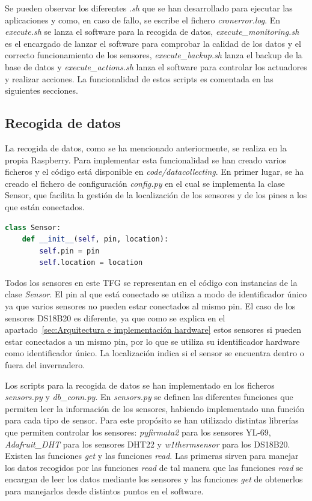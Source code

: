 \documentclass[a4paper, 12pt, oneside]{book}
\begin{document}
Se pueden observar los diferentes \textit{.sh} que se han desarrollado para ejecutar las aplicaciones y como, en caso de fallo, se escribe el fichero \textit{cronerror.log}.
En \textit{execute.sh} se lanza el software para la recogida de datos, \textit{execute\_monitoring.sh} es el encargado de lanzar el software para comprobar la calidad de los datos y el correcto funcionamiento de los sensores, \textit{execute\_backup.sh} lanza el backup de la base de datos y \textit{execute\_actions.sh} lanza el software para controlar los actuadores y realizar acciones. La funcionalidad de estos scripts es comentada en las siguientes secciones.

\subsection{Recogida de datos}
\label{subsec:recogida de datos}
La recogida de datos, como se ha mencionado anteriormente, se realiza en la propia Raspberry. Para implementar esta funcionalidad se han creado varios ficheros y el código está disponible en \textit{code/datacollecting}. En primer lugar, se ha creado el fichero de configuración \textit{config.py} en el cual se implementa la clase Sensor, que facilita la gestión de la localización de los sensores y de los pines a los que están conectados.

\begin{lstlisting}[language=Python]
class Sensor:
    def __init__(self, pin, location):
        self.pin = pin
        self.location = location
\end{lstlisting}

Todos los sensores en este TFG se representan en el código con instancias de la clase \textit{Sensor}. El pin al que está conectado se utiliza a modo de identificador único ya que varios sensores no pueden estar conectados al mismo pin. El caso de los sensores DS18B20 es diferente, ya que como se explica en el apartado~\ref{sec:Arquitectura e implementación hardware} estos sensores si pueden estar conectados a un mismo pin, por lo que se utiliza su identificador hardware como identificador único. La localización indica si el sensor se encuentra dentro o fuera del invernadero.

Los scripts para la recogida de datos se han implementado en los ficheros \textit{sensors.py} y \textit{db\_conn.py}. En \textit{sensors.py} se definen las diferentes funciones que permiten leer la información de los sensores, habiendo implementado una función para cada tipo de sensor. Para este propósito se han utilizado distintas librerías que permiten controlar los sensores: \textit{pyfirmata2} para los sensores YL-69, \textit{Adafruit\_DHT} para los sensores DHT22 y \textit{w1thermsensor} para los DS18B20.
Existen las funciones \textit{get} y las funciones \textit{read}. Las primeras sirven para manejar los datos recogidos por las funciones \textit{read} de tal manera que las funciones \textit{read} se encargan de leer los datos mediante los sensores y las funciones \textit{get} de obtenerlos para manejarlos desde distintos puntos en el software.
\end{document}
